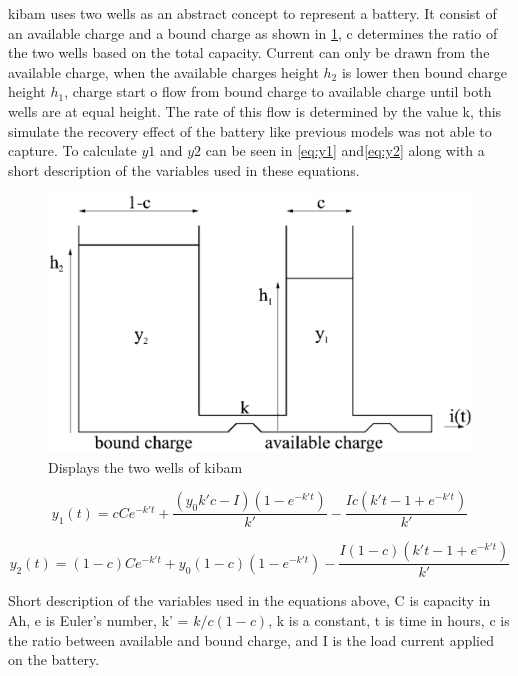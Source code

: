 \gls{kibam} uses two wells as an abstract concept to represent a battery. It consist of an available charge and a bound charge as shown in \cref{fig:kibam_wells}, c determines the ratio of the two wells based on the total capacity. Current can only be drawn from the available charge, when the available charges height $h_2$ is lower then bound charge height $h_1$, charge start o flow from bound charge to available charge until both wells are at equal height. The rate of this flow is determined by the value k, this simulate the recovery effect of the battery like previous models was not able to capture. To calculate $y{1}$ and $y{2}$ can be seen in \cref{eq:y1} and\cref{eq:y2} along with a short description of the variables used in these equations.

\begin{figure}[H]
	\center
	\includegraphics[width=\textwidth/2]{graphics/kibam.jpg}
	\caption{Displays the two wells of \gls{kibam}}
	\label{fig:kibam_wells}
\end{figure}

\begin{equation}\label{eq:y1}
y_1(t) = cCe^{-k't}+\frac{(y_0k'c-I)(1-e^{-k't})}{k'}-\frac{Ic(k't-1+e^{-k't})}{k'}
\end{equation}

\begin{equation}\label{eq:y2}
y_2(t) = (1-c)Ce^{-k't}+y_0(1-c)(1-e^{-k't})-\frac{I(1-c)(k't-1+e^{-k't})}{k'}
\end{equation}

Short description of the variables used in the equations above, C is capacity in Ah, e is Euler's number, k' = $k/c(1-c)$, k is a constant, t is time in hours, c is the ratio between available and bound charge, and I is the load current applied on the battery.


